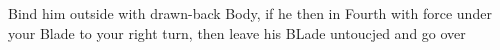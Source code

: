 \exercise{}

Bind him outside with drawn-back Body, if he then in Fourth with force under your Blade to your right turn, then leave his BLade untoucjed and go over
